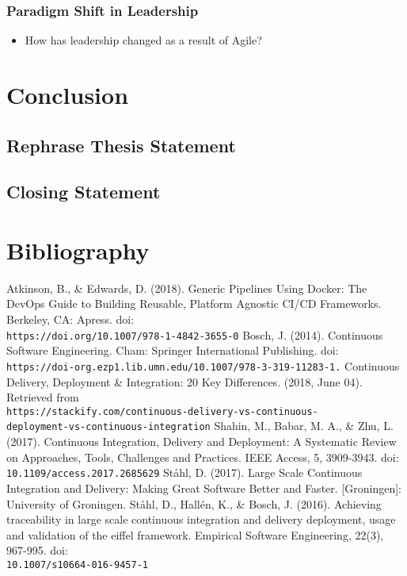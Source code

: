 \documentclass[11pt,a4paper]{article}
\begin{document}
		\subsubsection{Paradigm Shift in Leadership}
		\begin{itemize}[noitemsep]
			\item How has leadership changed as a result of Agile?
		\end{itemize}

\section{Conclusion}
	\subsection{Rephrase Thesis Statement}
	\subsection{Closing Statement}

\newpage
\section{Bibliography}
\begin{thebibliography}{6}
	 Atkinson, B., \& Edwards, D. (2018). Generic Pipelines Using Docker: The DevOps Guide to Building Reusable, Platform Agnostic CI/CD Frameworks. Berkeley, CA: Apress. doi:\\\texttt{https://doi.org/10.1007/978-1-4842-3655-0}
	 Bosch, J. (2014). Continuous Software Engineering. Cham: Springer International Publishing. doi:\\\texttt{https://doi-org.ezp1.lib.umn.edu/10.1007/978-3-319-11283-1.}
	 Continuous Delivery, Deployment \& Integration: 20 Key Differences. (2018, June 04). Retrieved from \\\texttt{https://stackify.com/continuous-delivery-vs-continuous-\\deployment-vs-continuous-integration}
	 Shahin, M., Babar, M. A., \& Zhu, L. (2017). Continuous Integration, Delivery and Deployment: A Systematic Review on Approaches, Tools, Challenges and Practices. IEEE Access, 5, 3909-3943. doi:\\\texttt{10.1109/access.2017.2685629}
	 St\aa hl, D. (2017). Large Scale Continuous Integration and Delivery: Making Great Software Better and Faster. [Groningen]: University of Groningen.
	 St\aa hl, D., Hall\'{e}n, K., \& Bosch, J. (2016). Achieving traceability in large scale continuous integration and delivery deployment, usage and validation of the eiffel framework. Empirical Software Engineering, 22(3), 967-995. doi:\\\texttt{10.1007/s10664-016-9457-1}
\end{thebibliography}
\end{document}
